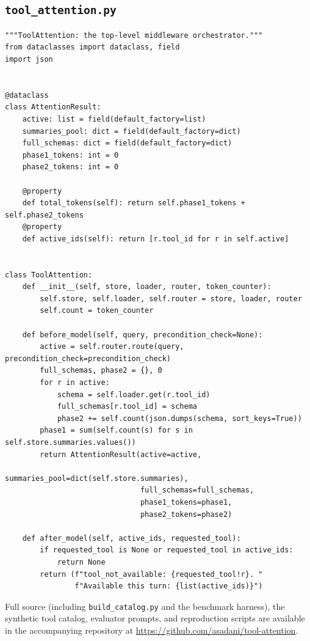 \documentclass[11pt]{article}
\begin{document}
\subsection{\texttt{tool\_attention.py}}
\begin{verbatim}
"""ToolAttention: the top-level middleware orchestrator."""
from dataclasses import dataclass, field
import json


@dataclass
class AttentionResult:
    active: list = field(default_factory=list)
    summaries_pool: dict = field(default_factory=dict)
    full_schemas: dict = field(default_factory=dict)
    phase1_tokens: int = 0
    phase2_tokens: int = 0

    @property
    def total_tokens(self): return self.phase1_tokens + self.phase2_tokens
    @property
    def active_ids(self): return [r.tool_id for r in self.active]


class ToolAttention:
    def __init__(self, store, loader, router, token_counter):
        self.store, self.loader, self.router = store, loader, router
        self.count = token_counter

    def before_model(self, query, precondition_check=None):
        active = self.router.route(query, precondition_check=precondition_check)
        full_schemas, phase2 = {}, 0
        for r in active:
            schema = self.loader.get(r.tool_id)
            full_schemas[r.tool_id] = schema
            phase2 += self.count(json.dumps(schema, sort_keys=True))
        phase1 = sum(self.count(s) for s in self.store.summaries.values())
        return AttentionResult(active=active,
                               summaries_pool=dict(self.store.summaries),
                               full_schemas=full_schemas,
                               phase1_tokens=phase1,
                               phase2_tokens=phase2)

    def after_model(self, active_ids, requested_tool):
        if requested_tool is None or requested_tool in active_ids:
            return None
        return (f"tool_not_available: {requested_tool!r}. "
                f"Available this turn: {list(active_ids)}")
\end{verbatim}

Full source (including \texttt{build\_catalog.py} and the benchmark harness), the synthetic tool catalog, evaluator prompts, and reproduction scripts are available in the accompanying repository at \url{https://github.com/asadani/tool-attention}.
\end{document}
